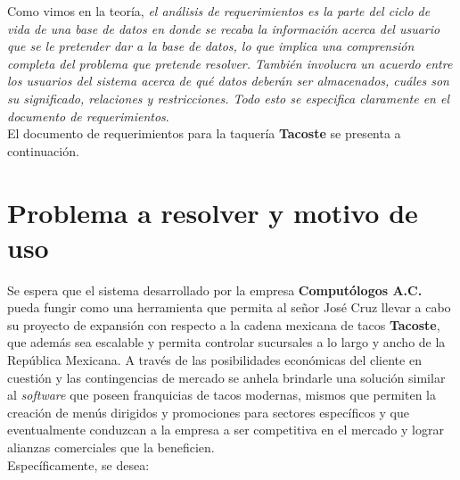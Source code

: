 \documentclass[11pt,letterpaper]{article}
\begin{document}
\begin{center}
\tableofcontents
\end{center}

\newpage


Como vimos en la teoría, \textit{el análisis de requerimientos es la parte del
ciclo de vida de una base de datos en donde se recaba la información acerca
del usuario que se le pretender dar a la base de datos, lo que implica una
comprensión completa del problema que pretende resolver. También involucra un acuerdo entre los usuarios del sistema acerca de qué datos deberán ser
almacenados, cuáles son su significado, relaciones y restricciones. Todo esto
se especifica claramente en el documento de requerimientos}.\\

 El documento
de requerimientos para la taquería \textbf{Tacoste} se presenta a continuación.

\section{Problema a resolver y motivo de uso}

Se espera que el sistema desarrollado por la empresa \textbf{Computólogos A.C.} pueda fungir como una herramienta que permita al señor José Cruz llevar a cabo su proyecto de expansión con respecto a la cadena mexicana de tacos \textbf{Tacoste}, que además sea escalable y permita controlar sucursales a lo largo y ancho de la República Mexicana. A través de las posibilidades económicas del cliente en cuestión y las contingencias de mercado se anhela brindarle una solución similar al \textit{software} que poseen franquicias de tacos modernas, mismos que permiten la creación de menús dirigidos y promociones para sectores específicos y que eventualmente conduzcan a la empresa a ser competitiva en el mercado y lograr alianzas comerciales que la beneficien. \\

Específicamente, se desea:
\end{document}
